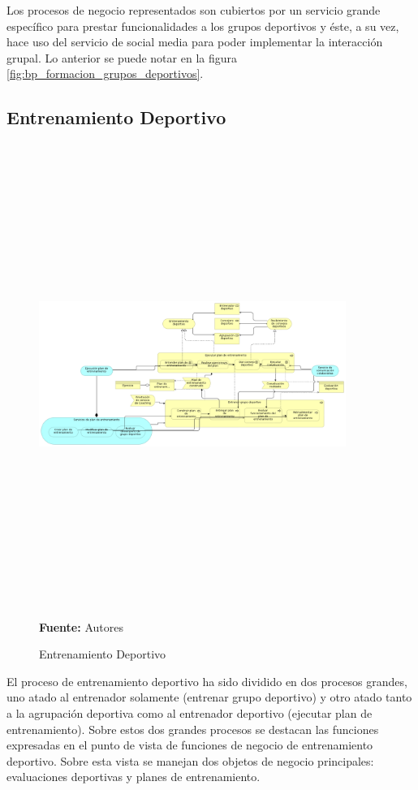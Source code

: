 Los procesos de negocio representados son cubiertos por un servicio grande específico para prestar funcionalidades a los grupos deportivos y éste, a su vez, hace uso del servicio de social media para poder implementar la interacción grupal. Lo anterior se puede notar en la figura \ref{fig:bp_formacion_grupos_deportivos}.

\subsection{Entrenamiento Deportivo}

\begin{figure}[!htb]
  \begin{center}
    \includegraphics[angle=90,width=10cm,height=15cm]{./imagenes/Archimate/vistas/business_process/entrenamientodeportivo.png}
    \caption{Entrenamiento Deportivo}
    \label{fig:bp_entrenamiento_deportivo}
    \textbf{Fuente:}  Autores \\
  \end{center}
\end{figure}

El proceso de entrenamiento deportivo ha sido dividido en dos procesos grandes, uno atado al entrenador solamente (entrenar grupo deportivo) y otro atado tanto a la agrupación deportiva como al entrenador deportivo (ejecutar plan de entrenamiento). Sobre estos dos grandes procesos se destacan las funciones expresadas en el punto de vista de funciones de negocio de entrenamiento deportivo. Sobre esta vista se manejan dos objetos de negocio principales: evaluaciones deportivas y planes de entrenamiento.

